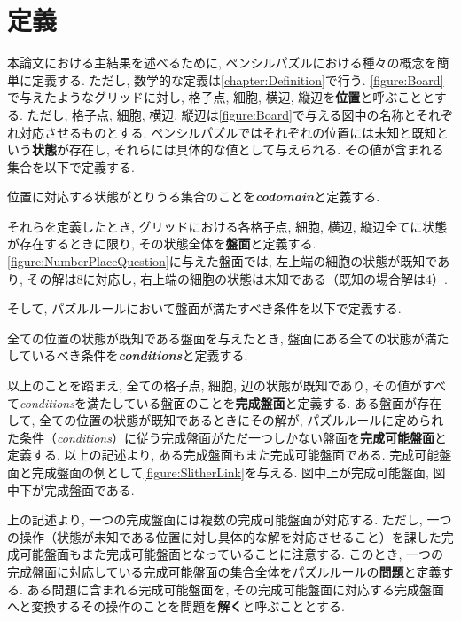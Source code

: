 \section{定義}\label{section:IntroDefinition}
本論文における主結果を述べるために, ペンシルパズルにおける種々の概念を簡単に定義する. ただし, 数学的な定義は\cref{chapter:Definition}で行う. \cref{figure:Board}で与えたようなグリッドに対し, 格子点, 細胞, 横辺, 縦辺を\textbf{位置}と呼ぶこととする. ただし, 格子点, 細胞, 横辺, 縦辺は\cref{figure:Board}で与える図中の名称とそれぞれ対応させるものとする. ペンシルパズルではそれぞれの位置には未知と既知という\textbf{状態}が存在し, それらには具体的な値として与えられる. その値が含まれる集合を以下で定義する.
\begin{definition}
  位置に対応する状態がとりうる集合のことを\textbf{\textit{codomain}}と定義する.
\end{definition}
それらを定義したとき, グリッドにおける各格子点, 細胞, 横辺, 縦辺全てに状態が存在するときに限り, その状態全体を\textbf{盤面}と定義する. \cref{figure:NumberPlaceQuestion}に与えた盤面では, 左上端の細胞の状態が既知であり, その解は8に対応し, 右上端の細胞の状態は未知である（既知の場合解は4）.

そして, パズルルールにおいて盤面が満たすべき条件を以下で定義する.
\begin{definition}
  全ての位置の状態が既知である盤面を与えたとき, 盤面にある全ての状態が満たしているべき条件を\textbf{\textit{conditions}}と定義する.
\end{definition}

以上のことを踏まえ, 全ての格子点, 細胞, 辺の状態が既知であり, その値がすべて\textit{conditions}を満たしている盤面のことを\textbf{完成盤面}と定義する. ある盤面が存在して, 全ての位置の状態が既知であるときにその解が, パズルルールに定められた条件（\textit{conditions}）に従う完成盤面がただ一つしかない盤面を\textbf{完成可能盤面}と定義する. 以上の記述より, ある完成盤面もまた完成可能盤面である. 完成可能盤面と完成盤面の例として\cref{figure:SlitherLink}を与える. 図中上が完成可能盤面, 図中下が完成盤面である.

上の記述より, 一つの完成盤面には複数の完成可能盤面が対応する. ただし, 一つの操作（状態が未知である位置に対し具体的な解を対応させること）を課した完成可能盤面もまた完成可能盤面となっていることに注意する. このとき, 一つの完成盤面に対応している完成可能盤面の集合全体をパズルルールの\textbf{問題}と定義する. ある問題に含まれる完成可能盤面を, その完成可能盤面に対応する完成盤面へと変換するその操作のことを問題を\textbf{解く}と呼ぶこととする.

